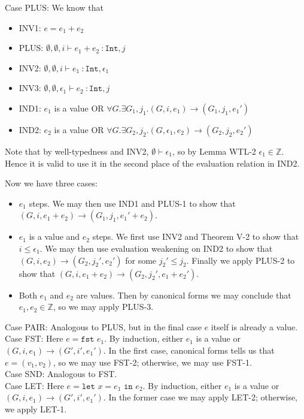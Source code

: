 \documentclass{article}
\newcommand{\Z}{\mathbb{Z}}
\begin{document}
\clearpage
Case PLUS: We know that
\begin{itemize}
	\item INV1:	$e = e_1 + e_2$
	\item PLUS: $\emptyset, \emptyset, i \vdash e_1 + e_2\ \colon \texttt{Int}, j$
	\item INV2: $\emptyset, \emptyset, i \vdash e_1\ \colon \texttt{Int}, \epsilon_1$
	\item INV3: $\emptyset, \emptyset, \epsilon_1 \vdash e_2\ \colon \texttt{Int}, j$
	\item IND1: $e_1$ is a value OR $\forall G.\exists G_1, j_1.(G, i, e_1) \rightarrow (G_1, j_1, e_1')$
	\item IND2: $e_2$ is a value OR $\forall G.\exists G_2, j_2.(G, \epsilon_1, e_2) \rightarrow (G_2, j_2, e_2')$
\end{itemize}
Note that by well-typedness and INV2, $\emptyset \vdash \epsilon_1$, so by Lemma WTL-2 $\epsilon_1 \in \Z$. Hence it is valid to use it in the second place of the evaluation relation in IND2.

Now we have three cases:
\begin{itemize}
	\item $e_1$ steps. We may then use IND1 and PLUS-1 to show that $(G, i, e_1 + e_2) \rightarrow (G_1, j_1, e_1'+e_2)$.
	\item $e_1$ is a value and $e_2$ steps. We first use INV2 and Theorem V-2 to show that $i \leq \epsilon_1$. We may then use evaluation weakening on IND2 to show that $(G, i, e_2) \rightarrow (G_2, j_2', e_2')$ for some $j_2' \leq j_2$. Finally we apply PLUS-2 to show that $(G, i, e_1+e_2) \rightarrow (G_2, j_2', e_1+e_2')$.
	\item Both $e_1$ and $e_2$ are values. Then by canonical forms we may conclude that $e_1, e_2 \in \Z$, so we may apply PLUS-3.
\end{itemize}

Case PAIR: Analogous to PLUS, but in the final case $e$ itself is already a value.
\\

Case FST: Here $e = \texttt{fst }e_1$. By induction, either $e_1$ is a value or $(G, i, e_1) \rightarrow (G', i', e_1')$. In the first case, canonical forms tells us that $e = (v_1, v_2)$, so we may use FST-2; otherwise, we may use FST-1.
\\

Case SND: Analogous to FST.
\\

Case LET: Here $e = \texttt{let } x = e_1 \texttt{ in } e_2$. By induction, either $e_1$ is a value or $(G, i, e_1) \rightarrow (G', i', e_1')$. In the former case we may apply LET-2; otherwise, we apply LET-1.
\\
\end{document}
